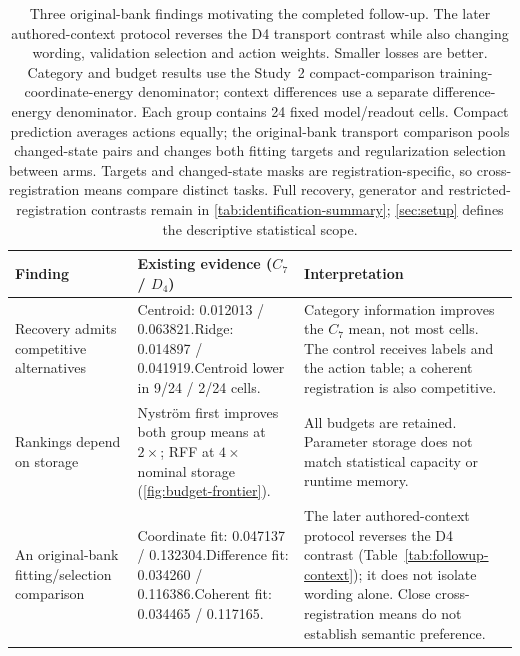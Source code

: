 \begin{table}[t]
\caption{Three original-bank findings motivating the completed follow-up. The later authored-context protocol reverses the D4 transport contrast while also changing wording, validation selection and action weights. Smaller losses are better. Category and budget results use the Study~2 compact-comparison training-coordinate-energy denominator; context differences use a separate difference-energy denominator. Each group contains 24 fixed model/readout cells. Compact prediction averages actions equally; the original-bank transport comparison pools changed-state pairs and changes both fitting targets and regularization selection between arms. Targets and changed-state masks are registration-specific, so cross-registration means compare distinct tasks. Full recovery, generator and restricted-registration contrasts remain in \cref{tab:identification-summary}; \cref{sec:setup} defines the descriptive statistical scope.}
\label{tab:main-findings}
\centering\small
\setlength{\tabcolsep}{4pt}
\renewcommand{\arraystretch}{1.10}
\begin{tabular}{@{}p{}p{}p{}@{}}
\toprule
Finding & Existing evidence ($C_7$ / $D_4$) & Interpretation \\
\midrule
Recovery admits competitive alternatives & Centroid: 0.012013 / 0.063821.\newline Ridge: 0.014897 / 0.041919.\newline Centroid lower in 9/24 / 2/24 cells. & Category information improves the $C_7$ mean, not most cells. The control receives labels and the action table; a coherent registration is also competitive. \\
\addlinespace[3pt]
Rankings depend on storage & Nystr\"om first improves both group means at $2\times$; RFF at $4\times$ nominal storage (\cref{fig:budget-frontier}). & All budgets are retained. Parameter storage does not match statistical capacity or runtime memory. \\
\addlinespace[3pt]
An original-bank fitting/selection comparison & Coordinate fit: 0.047137 / 0.132304.\newline Difference fit: 0.034260 / 0.116386.\newline Coherent fit: 0.034465 / 0.117165. & The later authored-context protocol reverses the D4 contrast (Table~\ref{tab:followup-context}); it does not isolate wording alone. Close cross-registration means do not establish semantic preference. \\
\bottomrule
\end{tabular}
\end{table}
